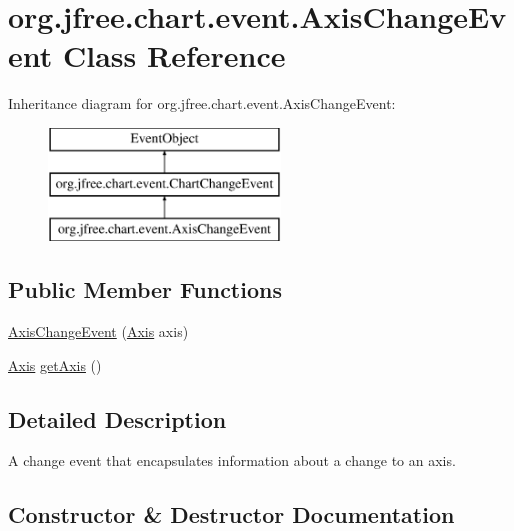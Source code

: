 \hypertarget{classorg_1_1jfree_1_1chart_1_1event_1_1_axis_change_event}{}\section{org.\+jfree.\+chart.\+event.\+Axis\+Change\+Event Class Reference}
\label{classorg_1_1jfree_1_1chart_1_1event_1_1_axis_change_event}
Inheritance diagram for org.\+jfree.\+chart.\+event.\+Axis\+Change\+Event\+:\begin{figure}[H]
\begin{center}
\leavevmode
\includegraphics[height=3.000000cm]{classorg_1_1jfree_1_1chart_1_1event_1_1_axis_change_event}
\end{center}
\end{figure}
\subsection*{Public Member Functions}
\begin{DoxyCompactItemize}
\item 
\mbox{\hyperlink{classorg_1_1jfree_1_1chart_1_1event_1_1_axis_change_event_a0728e5d27c3325e89912957821ee8a09}{Axis\+Change\+Event}} (\mbox{\hyperlink{classorg_1_1jfree_1_1chart_1_1axis_1_1_axis}{Axis}} axis)
\item 
\mbox{\hyperlink{classorg_1_1jfree_1_1chart_1_1axis_1_1_axis}{Axis}} \mbox{\hyperlink{classorg_1_1jfree_1_1chart_1_1event_1_1_axis_change_event_ac9f904b878763c7f459d3b78f8584c25}{get\+Axis}} ()
\end{DoxyCompactItemize}


\subsection{Detailed Description}
A change event that encapsulates information about a change to an axis. 

\subsection{Constructor \& Destructor Documentation}
\mbox{\label{classorg_1_1jfree_1_1chart_1_1event_1_1_axis_change_event_a0728e5d27c3325e89912957821ee8a09}} 
